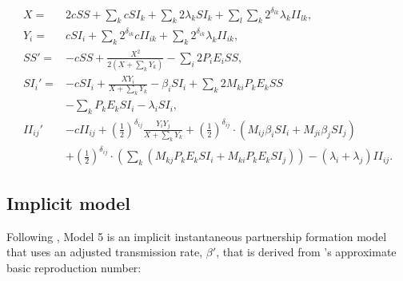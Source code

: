 \documentclass[10pt,letterpaper]{article}
\newcommand{\khalf}{\left(\frac{1}{2}\right)^{\delta_{ij}}}  %
\providecommand{\DIFaddtex}[1]{{\protect\color{blue}\uwave{#1}}} %
\providecommand{\DIFdeltex}[1]{{\protect\color{red}\sout{#1}}}                      %
\providecommand{\DIFaddbegin}{} %
\providecommand{\DIFaddend}{} %
\providecommand{\DIFdelbegin}{} %
\providecommand{\DIFdelend}{} %
\providecommand{\DIFadd}[1]{\texorpdfstring{\DIFaddtex{#1}}{#1}} %
\providecommand{\DIFdel}[1]{\texorpdfstring{\DIFdeltex{#1}}{}} %
\newcommand{\DIFscaledelfig}{0.5}
\newlength{\DIFdelgraphicswidth} %
\newlength{\DIFdelgraphicsheight} %
\newcommand{\DIFaddincludegraphics}[2][]{{\color{blue}\fbox{\DIFOincludegraphics[#1]{#2}}}} %
\newcommand{\DIFdelincludegraphics}[2][]{%
\sbox{\DIFdelgraphicsbox}{\DIFOincludegraphics[#1]{#2}}%
\settoboxwidth{\DIFdelgraphicswidth}{\DIFdelgraphicsbox} %
\settoboxtotalheight{\DIFdelgraphicsheight}{\DIFdelgraphicsbox} %
\scalebox{\DIFscaledelfig}{%
\parbox[b]{\DIFdelgraphicswidth}{\usebox{\DIFdelgraphicsbox}\\[-\baselineskip] \rule{\DIFdelgraphicswidth}{0em}}\llap{\resizebox{\DIFdelgraphicswidth}{\DIFdelgraphicsheight}{%
\setlength{\unitlength}{\DIFdelgraphicswidth}%
\begin{picture}(1,1)%
\thicklines\linethickness{2pt} %
{\color[rgb]{1,0,0}\put(0,0){\framebox(1,1){}}}%
{\color[rgb]{1,0,0}\put(0,0){\line( 1,1){1}}}%
{\color[rgb]{1,0,0}\put(0,1){\line(1,-1){1}}}%
\end{picture}%
}\hspace*{3pt}}} %
} %
\DeclareRobustCommand{\DIFaddbegin}{\DIFOaddbegin \let\includegraphics\DIFaddincludegraphics} %
\DeclareRobustCommand{\DIFaddend}{\DIFOaddend \let\includegraphics\DIFOincludegraphics} %
\DeclareRobustCommand{\DIFdelbegin}{\DIFOdelbegin \let\includegraphics\DIFdelincludegraphics} %
\DeclareRobustCommand{\DIFdelend}{\DIFOaddend \let\includegraphics\DIFOincludegraphics} %
\begin{document}
\begin{equation}
\DIFdelbegin %
\DIFdelend \DIFaddbegin \begin{aligned}
X =& 2 c SS + \sum_k c SI_k + \sum_k 2 \lambda_k SI_k + \sum_l \sum_k 2^{\delta_{lk}}  \lambda_k II_{lk},\\
Y_i =& c SI_i + \sum_k 2^{\delta_{ik}}  c II_{ik} + \sum_k  2^{\delta_{ik}}  \lambda_k II_{ik}, \\
SS'  =& - c SS + \frac{X^2}{2 (X + \sum_k Y_k)}  - \sum_i 2 P_i E_i SS,\\
SI_i' =& - c SI_i + \frac{X Y_i}{X + \sum_k Y_k} - \beta_i SI_i + \sum_k 2 M_{ki} P_k E_k SS\\
&- \sum_k P_k E_k SI_i - \lambda_i SI_i,\\
II_{ij}'& - c II_{ij} +\khalf \frac{Y_i Y_j}{X + \sum_k Y_k} + \khalf \cdot (M_{ij} \beta_i SI_i + M_{ji} \beta_j SI_j)\\
&+ \khalf \cdot (\sum_k (M_{kj} P_k E_k SI_i + M_{ki} P_k E_k SI_j)) -(\lambda_i + \lambda_j) II_{ij}.
\end{aligned}
\DIFaddend \end{equation}

\subsection*{Implicit model}

Following \cite{shirreff_transmission_2011}, Model 5 is an implicit instantaneous partnership formation model that uses an adjusted transmission rate, \DIFdelbegin \DIFdel{$\beta'$}\DIFdelend \DIFaddbegin \DIFadd{$\beta^\ast$}\DIFaddend , that is derived from \cite{hollingsworth_hiv1_2008}'s approximate basic reproduction number:
\end{document}
